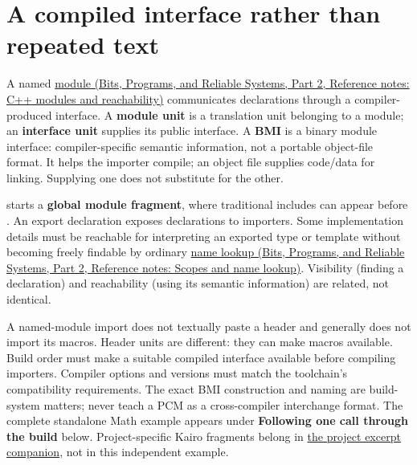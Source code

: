 \section{A compiled interface rather than repeated text}\label{05-engine-i-ch002-a-compiled-interface-rather-than-repeated-text}

\hypertarget{05-engine-i-ch002-a-compiled-interface-rather-than-repeated-text}{}

A named \href{../01-Bits-Programs-and-Reliable-Systems-P02/main.pdf\#appendix-410a611a5b8d}{module (Bits, Programs, and Reliable Systems, Part 2, Reference notes: C++ modules and reachability)} communicates declarations through a compiler-produced interface. A \textbf{module unit} is a translation unit belonging to a module; an \textbf{interface unit} supplies its public interface. A \textbf{BMI} is a binary module interface: compiler-specific semantic information, not a portable object-file format. It helps the importer compile; an object file supplies code/data for linking. Supplying one does not substitute for the other.

 starts a \textbf{global module fragment}, where traditional includes can appear before . An export declaration exposes declarations to importers. Some implementation details must be reachable for interpreting an exported type or template without becoming freely findable by ordinary \href{../01-Bits-Programs-and-Reliable-Systems-P02/main.pdf\#appendix-b12b31759da1}{name lookup (Bits, Programs, and Reliable Systems, Part 2, Reference notes: Scopes and name lookup)}. Visibility (finding a declaration) and reachability (using its semantic information) are related, not identical.

A named-module import does not textually paste a header and generally does not import its macros. Header units are different: they can make macros available. Build order must make a suitable compiled interface available before compiling importers. Compiler options and versions must match the toolchain's compatibility requirements. The exact BMI construction and naming are build-system matters; never teach a PCM as a cross-compiler interchange format. The complete standalone Math example appears under \textbf{Following one call through the build} below. Project-specific Kairo fragments belong in \hyperref[appendix-4e2236f53445-source-reported-c-project-excerpts]{the project excerpt companion}, not in this independent example.

